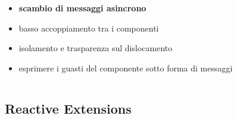 \begin{frame}[c]{\insertsectionhead}{\insertsubsectionhead}
\begin{columns}
\begin{column}{.47\textwidth}
                    \subsubsection{}\label{subsub:meddagedriven}
                    \begin{block}{\insertsubsubsectionhead}
                        \begin{itemize}
                            \item
                                \textbf{scambio di messaggi asincrono}
                            \item
                                basso accoppiamento tra i componenti
                            \item
                                isolamento e trasparenza sul dislocamento
                            \item
                                esprimere i guasti del componente sotto forma di messaggi
                        \end{itemize}
                    \end{block}
                \end{column}
            \end{columns}
        \end{frame}

        \subsection{Reactive Extensions}\label{subsec:rx}

